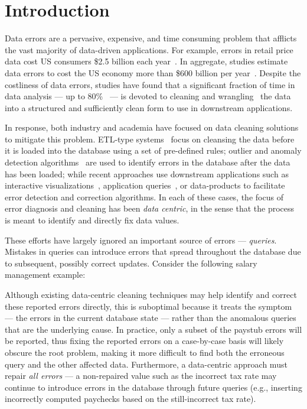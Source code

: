 
\section{Introduction}
\label{s:intro}

Data errors are a pervasive, expensive, and time consuming problem
that afflicts the vast majority of data-driven applications. For
example, errors in retail price data cost US consumers \$2.5 billion
each year~\cite{Fan2008}. In aggregate, studies estimate data errors
to cost the US economy more than \$600 billion per
year~\cite{eckerson2002}. Despite the costliness of data errors, 
studies have found that a significant fraction of time in data analysis 
--- up to 80\%~\cite{kandel2012} --- is devoted to cleaning and
wrangling~\cite{kandel2011wrangler} the data into a structured and
sufficiently clean form to use in downstream applications.

In response, both industry and academia have focused on data cleaning solutions to mitigate this problem.
ETL-type systems~\cite{krishnamurthy2009systemt, thomsen2005survey} focus on cleansing the data before it is loaded into the database
using a set of pre-defined rules; outlier and anomaly detection
 algorithms~\cite{chandola2007outlier} are used to identify errors
in the database after the data has been loaded; while recent approaches use downstream applications
such as interactive visualizations~\cite{kandel2011wrangler,Wu13}, application queries~\cite{krishnan2015sampleclean}, or 
data-products to facilitate error detection and correction algorithms.
In each of these cases, the focus of error diagnosis and cleaning has been {\it data centric}, in the sense that
the process is meant to identify and directly fix data values.

These efforts have largely ignored an important source of errors --- {\it queries}.
Mistakes in queries can introduce errors that spread throughout the database due to subsequent, possibly correct updates.
Consider the following salary management example:

\vspace*{-0.05in}

\vspace*{-0.05in}
%

Although existing data-centric cleaning techniques may help identify and correct these reported errors directly, 
this is suboptimal because it treats the symptom --- the errors in the current database state --- rather than the anomalous
queries that are the underlying cause.  In practice, only a subset of the paystub errors will be reported, thus fixing
the reported errors on a case-by-case basis will likely obscure the root problem, making it more difficult to
find both the erroneous query and the other affected data.  
Furthermore, a data-centric approach must repair \emph{all errors} --- a non-repaired value such as the incorrect tax rate
may continue to introduce errors in the database through future queries 
(e.g., inserting incorrectly computed paychecks based on the still-incorrect tax rate).

